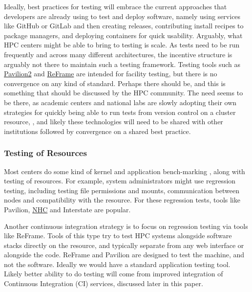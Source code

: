 Ideally, best practices for testing will embrace the current approaches that developers are already using to test and deploy software, namely using services like GitHub or GitLab and then creating releases, contributing install recipes to package managers, and deploying containers for quick usability. Arguably, what HPC centers might be able to bring to testing is scale. As tests need to be run frequently and across many different architectures, the incentive structure is arguably not there to maintain such a testing framework. Testing tools such as \href{https://github.com/hpc/pavilion2}{Pavilion2} and \href{https://github.com/eth-cscs/reframe}{ReFrame} are intended for facility testing, but there is no convergence on any kind of standard. Perhaps there should be, and this is something that should be discussed by the HPC community. The need seems to be there, as academic centers and national labs are slowly adopting their own strategies for quickly being able to run tests from version control on a cluster resource, \cite{}, and likely these technologies will need to be shared with other institutions followed by convergence on a shared best practice.

\subsubsection{Testing of Resources}

Most centers do some kind of kernel and application bench-marking \cite{measuring-hpc}, along with testing of resources.
For example, system administrators might use regression testing, including testing file permissions and mounts,
communication between nodes and compatibility with the resource. For these regression tests, tools like Pavilion, \href{https://github.com/mej/nhc}{NHC} and Interstate are popular.

Another continuous integration strategy is to focus on regression testing via tools like ReFrame.
Tools of this type try to test HPC systems alongside software stacks directly on the resource, and typically separate from any web interface or alongside the code.
ReFrame and Pavilion are designed to test the machine, and not the software. Ideally we would have a standard application testing tool. Likely better ability to do testing will come from improved integration of Continuous Integration (CI) services, discussed later in this paper.
